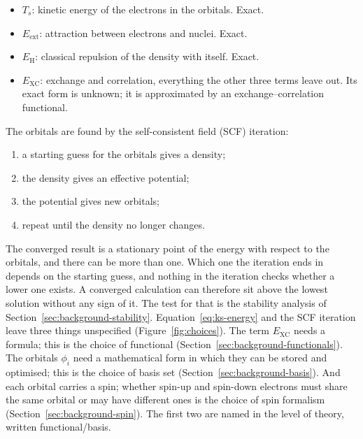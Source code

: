 \begin{itemize}
  \item $T_s$: kinetic energy of the electrons in the orbitals. Exact.
  \item $E_\text{ext}$: attraction between electrons and nuclei. Exact.
  \item $E_\text{H}$: classical repulsion of the density with itself. Exact.
  \item $E_\text{XC}$: exchange and correlation, everything the other three
    terms leave out. Its exact form is unknown; it is approximated by an
    exchange--correlation functional.
\end{itemize}

The orbitals are found by the self-consistent field (SCF) iteration:

\begin{enumerate}
  \item a starting guess for the orbitals gives a density;
  \item the density gives an effective potential;
  \item the potential gives new orbitals;
  \item repeat until the density no longer changes.
\end{enumerate}

The converged result is a stationary point of the energy with respect
to the orbitals, and there can be more than one. Which one the
iteration ends in depends on the starting guess, and nothing in the
iteration checks whether a lower one exists. A converged calculation
can therefore sit above the lowest solution without any sign of it.
The test for that is the stability analysis of
Section~\ref{sec:background-stability}.
Equation~\eqref{eq:ks-energy} and the SCF iteration leave three things
unspecified (Figure~\ref{fig:choices}). The term $E_\text{XC}$ needs a formula; this is the choice of
functional (Section~\ref{sec:background-functionals}). The orbitals
$\phi_i$ need a mathematical form in which they can be stored and
optimised; this is the choice of basis set
(Section~\ref{sec:background-basis}). And each orbital carries a spin;
whether spin-up and spin-down electrons must share the same orbital or may
have different ones is the choice of spin formalism
(Section~\ref{sec:background-spin}). The first two are named in the level
of theory, written functional/basis. 

